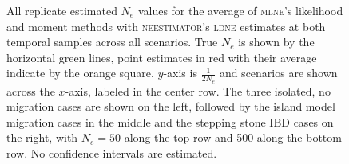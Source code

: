 \begin{landscape}
\begin{figure}[ht]
\centering
{}
\caption[ ~~ - All replicate estimated $N_e$ values for the average of \textsc{mlne}'s likelihood and moment methods with \textsc{neestimator}'s \textsc{ldne} estimates at both temporal samples across all scenarios.]{All replicate estimated $N_e$ values for the average of \textsc{mlne}'s likelihood and moment methods with \textsc{neestimator}'s \textsc{ldne} estimates at both temporal samples across all scenarios. True $N_e$ is shown by the horizontal green lines, point estimates in red with their average indicate by the orange square. $y$-axis is $\frac{1}{2 N_e}$ and scenarios are shown across the $x$-axis, labeled in the center row. The three isolated, no migration cases are shown on the left, followed by the island model migration cases in the middle and the stepping stone IBD cases on the right, with $N_e = 50$ along the top row and 500 along the bottom row. No confidence intervals are estimated.}
\label{fig:supp_avg3}
\end{figure}



\end{landscape}
